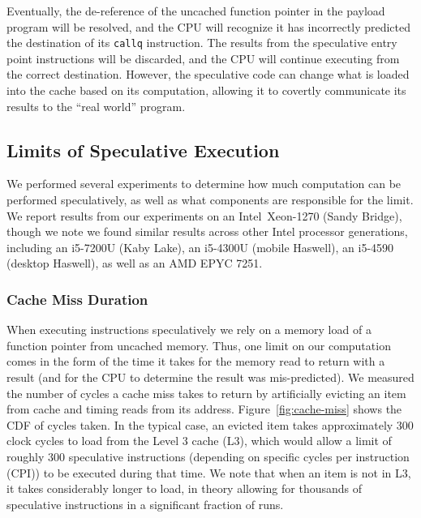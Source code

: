 Eventually, the de-reference of the uncached function pointer in the payload
program will be resolved, and the CPU will recognize it has incorrectly
predicted the destination of its \texttt{callq} instruction. The results from
the speculative entry point instructions will be discarded, and the CPU will
continue executing from the correct destination. However, the speculative code
can change what is loaded into the cache based on its computation, allowing it
to covertly communicate its results to the ``real world'' program.



\subsection{Limits of Speculative Execution}

\FigCacheMiss

\FigSpecMeasureNP

We performed several experiments to determine how much computation can be
performed
speculatively, as well as what components are responsible for the limit.
We report results from our experiments on an Intel~Xeon-1270 (Sandy Bridge),
though we note we found similar results across other Intel processor generations,
including an i5-7200U (Kaby Lake), %
an i5-4300U (mobile Haswell), %
an i5-4590 (desktop Haswell), %
as well as an AMD EPYC 7251. %



\subsubsection{Cache Miss Duration}
When executing instructions speculatively we rely on a memory load of a function
pointer from uncached memory. Thus, one limit on our computation comes
in the form of the time it takes for the memory read to return with a result
(and for the CPU to determine the result was mis-predicted).
We measured the number of cycles a
cache miss takes to return by artificially evicting an item from cache and
timing reads from its address.
Figure~\ref{fig:cache-miss} shows the CDF of cycles taken. In the typical case,
an evicted item takes approximately 300 clock cycles to load from the Level 3 cache (L3), which
would allow a limit of roughly 300 speculative instructions (depending on
specific cycles per instruction (CPI)) to be
executed during that time. We note that when an item is not in L3, it takes
considerably longer to load, in theory allowing for thousands of speculative
instructions in a significant fraction of runs.


